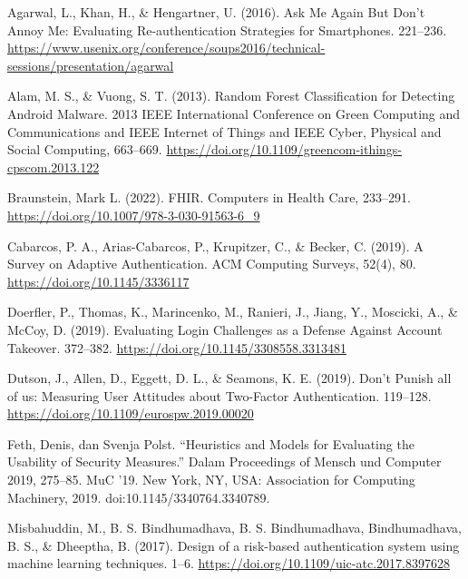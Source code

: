 \begin{thebibliography}{99}
    
    Agarwal, L., Khan, H., \& Hengartner, U. (2016). Ask Me Again But Don’t Annoy Me: Evaluating Re-authentication Strategies for Smartphones. 221–236. \url{https://www.usenix.org/conference/soups2016/technical-sessions/presentation/agarwal}
    
    Alam, M. S., \& Vuong, S. T. (2013). Random Forest Classification for Detecting Android Malware. 2013 IEEE International Conference on Green Computing and Communications and IEEE Internet of Things and IEEE Cyber, Physical and Social Computing, 663–669. \url{https://doi.org/10.1109/greencom-ithings-cpscom.2013.122}
    
    Braunstein, Mark L. (2022). FHIR. Computers in Health Care, 233–291. \url{https://doi.org/10.1007/978-3-030-91563-6_9}
    
    Cabarcos, P. A., Arias-Cabarcos, P., Krupitzer, C., \& Becker, C. (2019). A Survey on Adaptive Authentication. ACM Computing Surveys, 52(4), 80. \url{https://doi.org/10.1145/3336117}
    
    Doerfler, P., Thomas, K., Marincenko, M., Ranieri, J., Jiang, Y., Moscicki, A., \& McCoy, D. (2019). Evaluating Login Challenges as a Defense Against Account Takeover. 372–382. \url{https://doi.org/10.1145/3308558.3313481}
    
    Dutson, J., Allen, D., Eggett, D. L., \& Seamons, K. E. (2019). Don’t Punish all of us: Measuring User Attitudes about Two-Factor Authentication. 119–128. \url{https://doi.org/10.1109/eurospw.2019.00020}
    
    Feth, Denis, dan Svenja Polst. “Heuristics and Models for Evaluating the Usability of Security Measures.” Dalam Proceedings of Mensch und Computer 2019, 275–85. MuC ’19. New York, NY, USA: Association for Computing Machinery, 2019. doi:10.1145/3340764.3340789.
    
    Misbahuddin, M., B. S. Bindhumadhava, B. S. Bindhumadhava, Bindhumadhava, B. S., \& Dheeptha, B. (2017). Design of a risk-based authentication system using machine learning techniques. 1–6. \url{https://doi.org/10.1109/uic-atc.2017.8397628}
    

\end{thebibliography}
